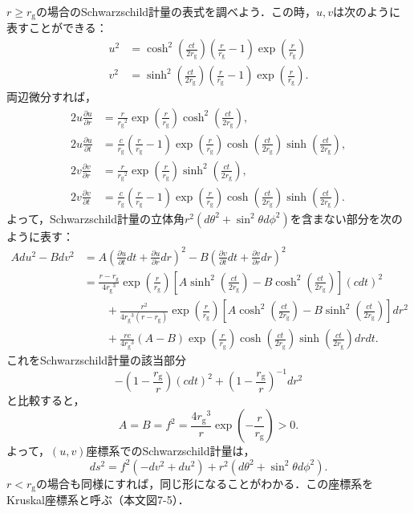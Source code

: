 \documentclass[a4paper]{ltjsreport}
\begin{document}
$r\geq{}r_\text{g}$の場合のSchwarzschild計量の表式を調べよう．この時，$u,v$は次のように表すことができる：
\begin{align*}
  u^2 &= \cosh^2\left(\frac{ct}{2r_\text{g}}\right)\left(\frac{r}{r_\text{g}} - 1\right)\exp\left(\frac{r}{r_\text{g}}\right)\\
  v^2 &= \sinh^2\left(\frac{ct}{2r_\text{g}}\right)\left(\frac{r}{r_\text{g}} - 1\right)\exp\left(\frac{r}{r_\text{g}}\right).
\end{align*}
両辺微分すれば，
\begin{align*}
  2u\frac{\partial{u}}{\partial{r}} &= \frac{r}{{r_\text{g}}^2}\exp\left(\frac{r}{r_\text{g}}\right)\cosh^2\left(\frac{ct}{2r_\text{g}}\right) , \\
  2u\frac{\partial{u}}{\partial{t}} &= \frac{c}{r_\text{g}}\left(\frac{r}{r_\text{g}} - 1\right)\exp\left(\frac{r}{r_\text{g}}\right)\cosh\left(\frac{ct}{2r_\text{g}}\right)\sinh\left(\frac{ct}{2r_\text{g}}\right) , \\
  2v\frac{\partial{v}}{\partial{r}} &= \frac{r}{{r_\text{g}}^2}\exp\left(\frac{r}{r_\text{g}}\right)\sinh^2\left(\frac{ct}{2r_\text{g}}\right) , \\
  2v\frac{\partial{v}}{\partial{t}} &= \frac{c}{r_\text{g}}\left(\frac{r}{r_\text{g}} - 1\right)\exp\left(\frac{r}{r_\text{g}}\right)\cosh\left(\frac{ct}{2r_\text{g}}\right)\sinh\left(\frac{ct}{2r_\text{g}}\right) .
\end{align*}
よって，Schwarzschild計量の立体角$r^2(d\theta^2 + \sin^2\theta{d\phi^2})$を含まない部分を次のように表す：
\begin{align*}
  Adu^2 - Bdv^2 &= A\left(\frac{\partial{u}}{\partial{t}}dt + \frac{\partial{u}}{\partial{r}}dr\right)^2 - B\left(\frac{\partial{v}}{\partial{t}}dt + \frac{\partial{v}}{\partial{r}}dr\right)^2 \\
  &= \frac{r - r_\text{g}}{4{r_\text{g}}^3}\exp\left(\frac{r}{r_\text{g}}\right)\left[A\sinh^2\left(\frac{ct}{2r_\text{g}}\right) - B\cosh^2\left(\frac{ct}{2r_\text{g}}\right)\right](cdt)^2 \\
  &\qquad + \frac{r^2}{4{r_\text{g}}^3(r - r_\text{g})}\exp\left(\frac{r}{r_\text{g}}\right)\left[A\cosh^2\left(\frac{ct}{2r_\text{g}}\right) - B\sinh^2\left(\frac{ct}{2r_\text{g}}\right)\right]dr^2 \\
  &\qquad + \frac{rc}{4{r_\text{g}}^3}(A - B)\exp\left(\frac{r}{r_\text{g}}\right)\cosh\left(\frac{ct}{2r_\text{g}}\right)\sinh\left(\frac{ct}{2r_\text{g}}\right)drdt.
\end{align*}
これをSchwarzschild計量の該当部分
\[ - \left(1 - \frac{r_\text{g}}{r}\right)(cdt)^2 + \left(1 - \frac{r_\text{g}}{r}\right)^{ - 1}dr^2\]
と比較すると，
\[ A=B=f^2=\frac{4{r_\text{g}}^3}{r}\exp\left( - \frac{r}{r_\text{g}}\right) > 0 .\]
よって，$(u,v)$座標系でのSchwarzschild計量は，
\[ ds^2=f^2( - dv^2 + du^2) + r^2(d\theta^2 + \sin^2\theta{d\phi^2}) . \]
$r<{r_\text{g}}$の場合も同様にすれば，同じ形になることがわかる．この座標系をKruskal座標系と呼ぶ（本文図7-5）．
\end{document}
